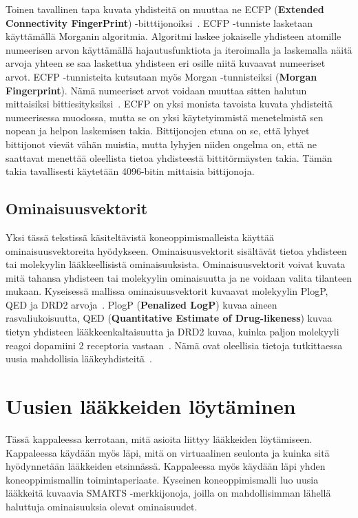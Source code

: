 \documentclass[finnish,twoside,censored,tkt,sw-line]{HYthesisML}
\begin{document}
Toinen tavallinen tapa kuvata yhdisteitä on muuttaa ne ECFP (\textbf{Extended Connectivity FingerPrint}) -bitttijonoiksi~\cite{RogersDavid2010EF}.
ECFP -tunniste lasketaan käyttämällä Morganin algoritmia.
Algoritmi laskee jokaiselle yhdisteen atomille numeerisen arvon käyttämällä hajautusfunktiota ja iteroimalla ja laskemalla näitä arvoja yhteen se saa laskettua yhdisteen eri osille niitä kuvaavat numeeriset arvot.
ECFP -tunnisteita kutsutaan myös Morgan -tunnisteiksi (\textbf{Morgan Fingerprint}).
Nämä numeeriset arvot voidaan muuttaa sitten halutun mittaisiksi bittiesityksiksi~\cite{RogersDavid2010EF}.
ECFP on yksi monista tavoista kuvata yhdisteitä numeerisessa muodossa, mutta se on yksi käytetyimmistä menetelmistä sen nopean ja helpon laskemisen takia.
Bittijonojen etuna on se, että lyhyet bittijonot vievät vähän muistia, mutta lyhyjen niiden ongelma on, että ne saattavat menettää oleellista tietoa yhdisteestä bittitörmäysten takia.
Tämän takia tavallisesti käytetään 4096-bitin mittaisia bittijonoja.

\section{Ominaisuusvektorit}

Yksi tässä tekstissä käsiteltävistä koneoppimismalleista käyttää ominaisuusvektoreita hyödykseen.
Ominaisuusvektorit sisältävät tietoa yhdisteen tai molekyylin lääkkeellisistä ominaisuuksista.
Ominaisuusvektorit voivat kuvata mitä tahansa yhdisteen tai molekyylin ominaisuutta ja ne voidaan valita tilanteen mukaan.
Kyseisessä mallissa ominaisuusvektorit kuvaavat molekyylin PlogP, QED ja DRD2 arvoja~\cite{ShinBonggun}.
PlogP (\textbf{Penalized LogP}) kuvaa aineen rasvaliukoisuutta, QED (\textbf{Quantitative Estimate of Drug-likeness}) kuvaa tietyn yhdisteen lääkkeenkaltaisuutta ja DRD2 kuvaa, kuinka paljon molekyyli reagoi dopamiini 2 receptoria vastaan~\cite{BickertonGRichard2012Qtcb}.
Nämä ovat oleellisia tietoja tutkittaessa uusia mahdollisia lääkeyhdisteitä~\cite{ShinBonggun}.

\chapter{Uusien lääkkeiden löytäminen}

Tässä kappaleessa kerrotaan, mitä asioita liittyy lääkkeiden löytämiseen.
Kappaleessa käydään myös läpi, mitä on virtuaalinen seulonta ja kuinka sitä hyödynnetään lääkkeiden etsinnässä.
Kappaleessa myös käydään läpi yhden koneoppimismallin toimintaperiaate.
Kyseinen koneoppimismalli luo uusia lääkkeitä kuvaavia SMARTS -merkkijonoja, joilla on mahdollisimman lähellä haluttuja ominaisuuksia olevat ominaisuudet.
\end{document}
